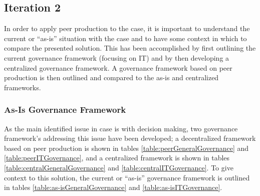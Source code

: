 \subsection{Iteration 2}

In order to apply peer production to the case, it is important to understand the current or ``as-is'' situation with the case and to have some context in which to compare the presented solution. This has been accomplished by first outlining the current governance framework (focusing on IT) and by then developing a centralized governance framework. A governance framework based on peer production is then outlined and compared to the as-is and centralized frameworks. 

\subsubsection{As-Is Governance Framework}

As the main identified issue in case is with decision making, two governance framework's  addressing this issue have been developed; a decentralized framework based on peer production is shown in tables \ref{table:peerGeneralGovernance} and \ref{table:peerITGovernance}, and a centralized framework is shown in tables \ref{table:centralGeneralGovernance} and \ref{table:centralITGovernance}. To give context to this solution, the current or ``as-is'' governance framework is outlined in tables \ref{table:as-isGeneralGovernance} and \ref{table:as-isITGovernance}.  

